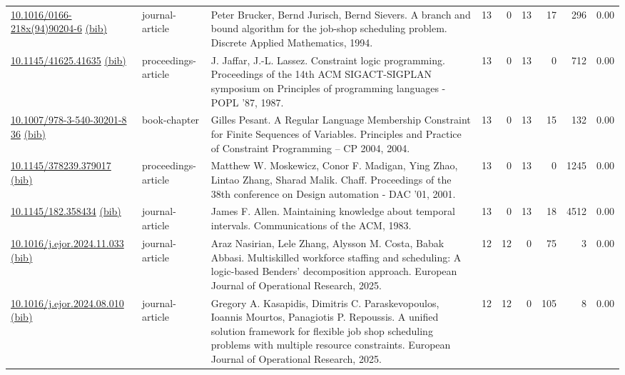 {\begin{longtable}{p{5cm}lp{11cm}rrrrrr}
\href{http://dx.doi.org/10.1016/0166-218x(94)90204-6}{10.1016/0166-218x(94)90204-6} \href{https://www.doi2bib.org/bib/10.1016/0166-218x(94)90204-6}{(bib)} & journal-article & Peter Brucker, Bernd Jurisch, Bernd Sievers. A branch and bound algorithm for the job-shop scheduling problem. Discrete Applied Mathematics, 1994. & 13 & 0 & 13 & 17 & 296 &  0.00\\
\href{http://dx.doi.org/10.1145/41625.41635}{10.1145/41625.41635} \href{https://www.doi2bib.org/bib/10.1145/41625.41635}{(bib)} & proceedings-article & J. Jaffar, J.-L. Lassez. Constraint logic programming. Proceedings of the 14th ACM SIGACT-SIGPLAN symposium on Principles of programming languages  - POPL '87, 1987. & 13 & 0 & 13 & 0 & 712 &  0.00\\
\href{http://dx.doi.org/10.1007/978-3-540-30201-8_36}{10.1007/978-3-540-30201-8 36} \href{https://www.doi2bib.org/bib/10.1007/978-3-540-30201-8_36}{(bib)} & book-chapter & Gilles Pesant. A Regular Language Membership Constraint for Finite Sequences of Variables. Principles and Practice of Constraint Programming – CP 2004, 2004. & 13 & 0 & 13 & 15 & 132 &  0.00\\
\href{http://dx.doi.org/10.1145/378239.379017}{10.1145/378239.379017} \href{https://www.doi2bib.org/bib/10.1145/378239.379017}{(bib)} & proceedings-article & Matthew W. Moskewicz, Conor F. Madigan, Ying Zhao, Lintao Zhang, Sharad Malik. Chaff. Proceedings of the 38th conference on Design automation  - DAC '01, 2001. & 13 & 0 & 13 & 0 & 1245 &  0.00\\
\href{http://dx.doi.org/10.1145/182.358434}{10.1145/182.358434} \href{https://www.doi2bib.org/bib/10.1145/182.358434}{(bib)} & journal-article & James F. Allen. Maintaining knowledge about temporal intervals. Communications of the ACM, 1983. & 13 & 0 & 13 & 18 & 4512 &  0.00\\
\href{http://dx.doi.org/10.1016/j.ejor.2024.11.033}{10.1016/j.ejor.2024.11.033} \href{https://www.doi2bib.org/bib/10.1016/j.ejor.2024.11.033}{(bib)} & journal-article & Araz Nasirian, Lele Zhang, Alysson M. Costa, Babak Abbasi. Multiskilled workforce staffing and scheduling: A logic-based Benders’ decomposition approach. European Journal of Operational Research, 2025. & 12 & 12 & 0 & 75 & 3 &  0.00\\
\href{http://dx.doi.org/10.1016/j.ejor.2024.08.010}{10.1016/j.ejor.2024.08.010} \href{https://www.doi2bib.org/bib/10.1016/j.ejor.2024.08.010}{(bib)} & journal-article & Gregory A. Kasapidis, Dimitris C. Paraskevopoulos, Ioannis Mourtos, Panagiotis P. Repoussis. A unified solution framework for flexible job shop scheduling problems with multiple resource constraints. European Journal of Operational Research, 2025. & 12 & 12 & 0 & 105 & 8 &  0.00\\

\end{longtable}}
